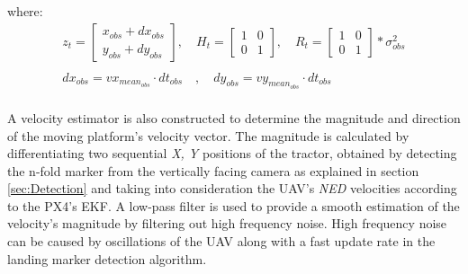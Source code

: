 \documentclass[conference, onecolumn, draftclsnofoot]{IEEEtran}
\begin{document}


where:
\begin{equation*}
    \begin{array}{l}
    z_{t} = \begin{bmatrix} 
                x_{obs} + dx_{obs} \\ 
                y_{obs} + dy_{obs}
                \end{bmatrix}, \quad 


    
    H_{t}= \begin{bmatrix} 
                1 & 0 \\ 
                0 & 1
                \end{bmatrix}, \quad
    R_{t} = \begin{bmatrix} 
                1 & 0 \\ 
                0 & 1
                \end{bmatrix}*\sigma^{2}_{obs}  \\ \\
                
dx_{obs} = vx_{mean_{obs}} \cdot dt_{obs} \quad , \quad
    dy_{obs} = vy_{mean_{obs}} \cdot dt_{obs} \quad \\
          
    \end{array}
\end{equation*}

A velocity estimator is also constructed to determine the magnitude
and direction of the moving platform's velocity vector. The magnitude
is calculated by differentiating two sequential \emph{X, Y} positions 
of the tractor, obtained by detecting the n-fold marker from the 
vertically facing camera as explained in section \ref{sec:Detection}  
and taking into consideration the
UAV's \emph{NED} velocities according to the PX4's EKF. A low-pass
filter is used to provide a smooth estimation of the velocity's
magnitude by filtering out high frequency noise. High frequency noise
can be caused by oscillations of the UAV along with a fast update rate
in the landing marker detection algorithm.  %
\end{document}
